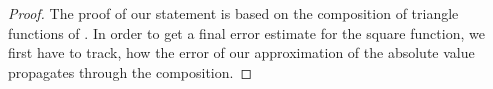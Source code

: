 \documentclass[twoside,11pt]{article}
\begin{document}
\begin{proof}
The proof of our statement is based on the composition of triangle functions of \cite{Yarotsky17ErrorBoundsApproximations}.
In order to get a final error estimate for the square function, we first have to track, how the error of our approximation of the absolute value propagates through the composition.


\end{proof}
\end{document}
